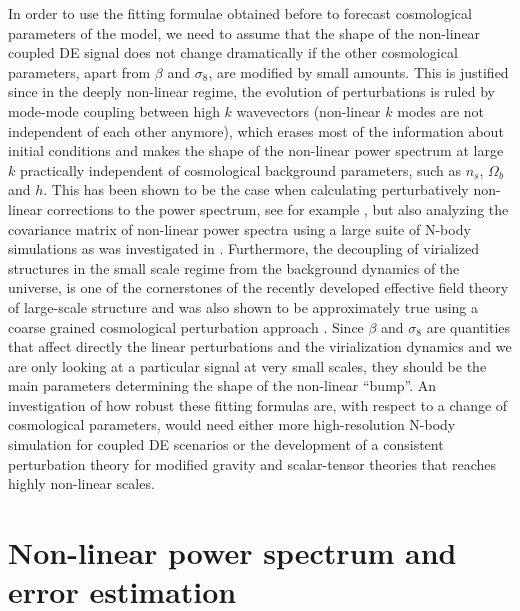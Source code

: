 In order to use the fitting formulae obtained before to forecast cosmological
parameters of the model, we need to assume that the shape of the non-linear
coupled DE signal does not change dramatically if the other cosmological
parameters, apart from $\beta$ and $\sigma_{8}$, are modified by
small amounts. This is justified since in the deeply non-linear regime,
the evolution of perturbations is ruled by mode-mode coupling between
high $k$ wavevectors (non-linear $k$ modes are not independent of
each other anymore), which erases most of the information about initial
conditions and makes the shape of the non-linear power spectrum at
large $k$ practically independent of cosmological background parameters,
such as $n_{s}$, $\Omega_{b}$ and $h$. This has been shown to be
the case when calculating perturbatively non-linear corrections to
the power spectrum, see for example \citep{crocce_memory_2006,pietroni_coarse-grained_2011},
but also analyzing the covariance matrix of non-linear power spectra
using a large suite of N-body simulations as was investigated in \citep{takahashi_non-gaussian_2011}.
Furthermore, the decoupling of virialized structures in the small
scale regime from the background dynamics of the universe, is one
of the cornerstones of the recently developed effective field theory
of large-scale structure \cite{baumann_cosmological_2012-2} and was
also shown to be approximately true using a coarse grained cosmological
perturbation approach \cite{manzotti2014acoarse}. Since $\beta$
and $\sigma_{8}$ are quantities that affect directly the linear perturbations
and the virialization dynamics and we are only looking at a particular
signal at very small scales, they should be the main parameters determining
the shape of the non-linear ``bump''. An investigation of how robust
these fitting formulas are, with respect to a change of cosmological
parameters, would need either more high-resolution N-body simulation
for coupled DE scenarios or the development of a consistent perturbation
theory for modified gravity and scalar-tensor theories that reaches
highly non-linear scales.


\section{Non-linear power spectrum and error estimation\label{sec:Errors-sources}}

